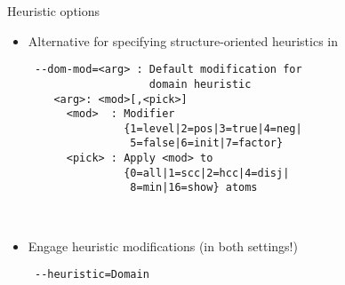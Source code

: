 \begin{frame}[fragile]{Heuristic options}
  \begin{itemize}
  \item<1-> Alternative for specifying structure-oriented heuristics
  \pause in \clasp
  \\\medskip
\begin{minipage}[t]{0.8\linewidth}\small
\begin{verbatim}
 --dom-mod=<arg> : Default modification for
                   domain heuristic
    <arg>: <mod>[,<pick>]
      <mod>  : Modifier
               {1=level|2=pos|3=true|4=neg|
                5=false|6=init|7=factor}
      <pick> : Apply <mod> to
               {0=all|1=scc|2=hcc|4=disj|
                8=min|16=show} atoms
\end{verbatim}
\end{minipage}
\\\medskip
\item<3-> Engage heuristic modifications (in both settings!)
\begin{verbatim}
 --heuristic=Domain
\end{verbatim}
  \end{itemize}
\end{frame}